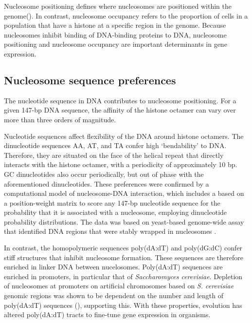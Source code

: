 \documentclass[parskip=full, numbers=noenddot]{scrreprt}
\begin{document}

Nucleosome positioning defines where nucleosomes are positioned within the genome(\cite{struhl_determinants_2013}).
In contrast, nucleosome occupancy refers to the proportion of cells in a population that have a histone at a specific region in the genome. %
Because nucleosomes inhibit binding of DNA-binding proteins to DNA, nucleosome positioning and nucleosome occupancy are important determinants in gene expression. %

\subsection{Nucleosome sequence preferences}
\label{ssec:emsaselex_intro_seqpref}

The nucleotide sequence in DNA contributes to nucleosome positioning.  For a given 147-bp DNA sequence, the affinity of the histone octamer can vary over more than three orders of magnitude.

Nucleotide sequences affect flexibility of the DNA around histone octamers.  The dinucleotide sequences AA, AT, and TA confer high `bendability' to DNA.  Therefore, they are situated on the face of the helical repeat that directly interacts with the histone octamer, with a periodicity of approximately 10 bp.  GC dinucleotides also occur periodically, but out of phase with the aforementioned dinucleotides.  These preferences were confirmed by a computational model of nucleosome-DNA interaction, which includes a based on a position-weight matrix to score any 147-bp nucleotide sequence for the probability that it is associated with a nucleosome, employing dinucleotide probability distributions.  The data was based on yeast-based genome-wide assay that identified DNA regions that were stably wrapped in nucleosomes \cite{segal_genomic_2006}.

In contrast, the homopolymeric sequences poly(dA:dT) and poly(dG:dC) confer stiff structures that inhibit nucleosome formation.  These sequences are therefore enriched in linker DNA between nucelosomes.  Poly(dA:dT) sequences are enriched in promoters, in particular that of \emph{Saccharomyces cerevisiae}.  Depletion of nucleosomes at promoters on artificial chromosomes based on \emph{S. cerevisiae} genomic regions was shown to be dependent on the number and length of poly(dA:dT) sequences (\cite{hughes_functional_2012}), supporting this.
With these properties, evolution has altered poly(dA:dT) tracts to fine-tune gene expression in organisms. %
\end{document}
